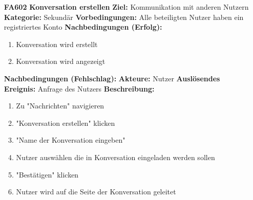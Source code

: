 \documentclass[parskip=full]{scrartcl}
\begin{document}
\begin{itemize}[nosep]
			
			\newpage
			\item[\textbf{FA602}]\textbf{ \gls{Konversation} erstellen} \label{sec:FA602}
			\newline \textbf{Ziel:} Kommunikation mit anderen Nutzern
			\newline \textbf{Kategorie:} Sekundär
			\newline \textbf{Vorbedingungen:} Alle beteiligten Nutzer haben ein registriertes Konto 
			\newline \textbf{Nachbedingungen (Erfolg):} 
			\begin{enumerate}[nosep]
				\item \gls{Konversation} wird erstellt
				\item \gls{Konversation} wird angezeigt 
			\end{enumerate}
			\textbf{Nachbedingungen (Fehlschlag):}
			\newline \textbf{Akteure:} Nutzer
			\newline \textbf{Auslösendes Ereignis:} Anfrage des Nutzers
			\newline \textbf{Beschreibung:}
			\begin{enumerate}[nosep]
				\item Zu "Nachrichten" navigieren
				\item "\gls{Konversation} erstellen" klicken
				\item "Name der \gls{Konversation} eingeben"
				\item Nutzer auswählen die in \gls{Konversation} eingeladen werden sollen
				\item "Bestätigen" klicken
				\item Nutzer wird auf die Seite der \gls{Konversation} geleitet\\
			\end{enumerate}
			

\end{itemize}
\end{document}
